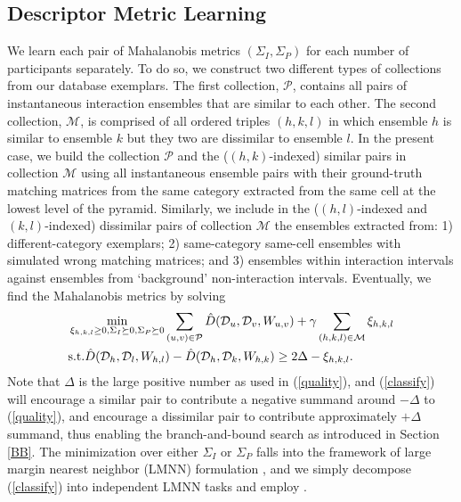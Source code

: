 \subsection{Descriptor Metric Learning}
We learn each pair of Mahalanobis metrics $(\Sigma_{I}, \Sigma_{P})$ for each number of participants separately. To do so, we construct two different types of collections from our database exemplars. The first collection, $\mathcal{P}$, contains all pairs of instantaneous interaction ensembles that are similar to each other. The second collection, $\mathcal{M}$, is comprised of all ordered triples $(h,k,l)$ in which ensemble $h$ is similar to ensemble $k$ but they two  are dissimilar to ensemble $l$. In the present case, we build the collection $\mathcal{P}$ and the ($(h,k)$-indexed) similar pairs in collection $\mathcal{M}$ using all instantaneous ensemble pairs with their ground-truth matching matrices from the same category extracted from the same cell at the lowest level of the pyramid. Similarly, we include in the ($(h,l)$-indexed and $(k,l)$-indexed) dissimilar pairs of collection $\mathcal{M}$ the ensembles extracted from: 1) different-category exemplars; 2) same-category same-cell ensembles with simulated wrong matching matrices; and 3) ensembles within interaction intervals against ensembles from `background' non-interaction intervals. Eventually, we find the Mahalanobis metrics by solving
\begin{equation}
\label{classify}
\begin{split}
&\min_{\xi_{h,k,l}\ge0, \Sigma_{I}\succeq 0, \Sigma_{P}\succeq 0} \sum_{(u,v)\in\mathcal{P}}\hat{D}(\mathcal{D}_{u}, \mathcal{D}_{v}, W_{u,v})+\gamma\sum_{(h,k,l)\in\mathcal{M}}\xi_{h,k,l}\\
&\textup{s.t.}  \hat{D}(\mathcal{D}_{h}, \mathcal{D}_{l}, W_{h,l})-\hat{D}(\mathcal{D}_{h}, \mathcal{D}_{k}, W_{h,k})\ge 2\Delta-\xi_{h,k,l}.
\end{split}
\end{equation}
Note that $\Delta$ is the large positive number as used in (\ref{quality}), and (\ref{classify}) will encourage a similar pair to contribute a negative summand around $-\Delta$ to (\ref{quality}), and encourage a dissimilar pair to contribute approximately $+\Delta$ summand,  thus enabling the branch-and-bound search as introduced in Section \ref{BB}.  The minimization over either $\Sigma_{I}$ or $\Sigma_{P}$ falls into the framework of large margin nearest neighbor (LMNN) formulation \cite{Weinberger:ML}, and we simply decompose (\ref{classify}) into independent LMNN tasks and employ \cite{Weinberger:ML}.
